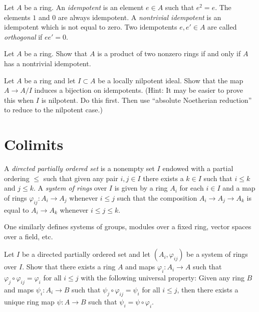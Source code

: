 \noindent
Let $A$ be a ring. An {\it idempotent} is an element $e \in A$
such that $e^2 = e$. The elements $1$ and $0$ are always idempotent.
A {\it nontrivial idempotent} is an idempotent which is not
equal to zero. Two idempotents $e, e' \in A$ are called {\it orthogonal}
if $ee' = 0$.

\begin{exercise}
\label{exercise-product}
Let $A$ be a ring. Show that $A$ is a product of two nonzero rings if
and only if $A$ has a nontrivial idempotent.
\end{exercise}

\begin{exercise}
\label{exercise-lift-idempotents}
Let $A$ be a ring and let $I \subset A$ be a locally nilpotent ideal.
Show that the map $A \to A/I$ induces a bijection on idempotents.
(Hint: It may be easier to prove this when $I$ is nilpotent. Do this first.
Then use ``absolute Noetherian reduction'' to reduce to the nilpotent case.)
\end{exercise}








\section{Colimits}
\label{section-colimits}


\begin{definition}
\label{definition-directed-poset}
A {\it directed partially ordered set} is a nonempty set $I$ endowed
with a partial ordering $\leq$ such that given any pair $i, j \in I$
there exists a $k \in I$ such that $i \leq k$ and $j \leq k$. A
{\it system of rings} over $I$ is given by a ring $A_i$ for each $i \in I$
and a map of rings $\varphi_{ij} : A_i \to A_j$ whenever $i \leq j$ such that
the composition $A_i \to A_j \to A_k$ is equal to
$A_i \to A_k$ whenever $i \leq j \leq k$.
\end{definition}

\noindent
One similarly defines systems of groups, modules over a fixed ring,
vector spaces over a field, etc.

\begin{exercise}
\label{exercise-directed-colimit}
Let $I$ be a directed partially ordered set and let
$(A_i, \varphi_{ij})$ be a system of rings over $I$.
Show that there exists a ring $A$ and maps $\varphi_i : A_i \to A$
such that $\varphi_j \circ \varphi_{ij} = \varphi_i$ for all $i \leq j$
with the following universal property: Given any ring $B$
and maps $\psi_i : A_i \to B$ such that
$\psi_j \circ \varphi_{ij} = \psi_i$ for all $i \leq j$, then
there exists a unique ring map $\psi : A \to B$ such that
$\psi_i = \psi \circ \varphi_i$.
\end{exercise}

